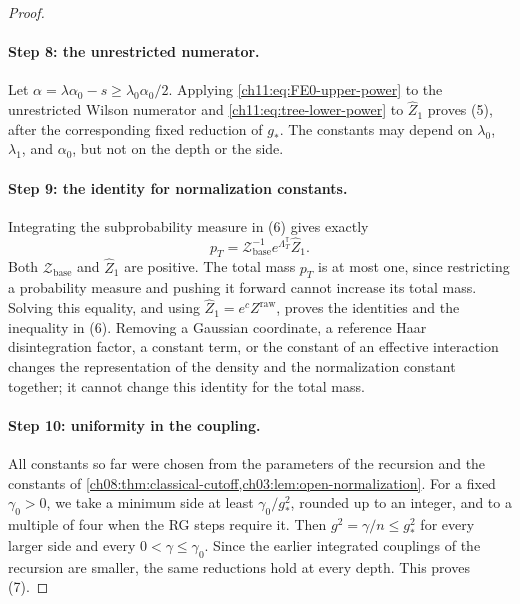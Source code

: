 \begin{proof}
\paragraph{Step 8: the unrestricted numerator.}
Let $\alpha=\lambda\alpha_0-s\ge\lambda_0\alpha_0/2$. Applying \eqref{ch11:eq:FE0-upper-power} to the unrestricted Wilson numerator and \eqref{ch11:eq:tree-lower-power} to $\widehat Z_1$ proves (5), after the corresponding fixed reduction of $g_*$. The constants may depend on $\lambda_0$, $\lambda_1$, and $\alpha_0$, but not on the depth or the side.

\paragraph{Step 9: the identity for normalization constants.}
Integrating the subprobability measure in (6) gives exactly
\[
 p_T=\mathcal Z_{\mathrm{base}}^{-1}e^{\Lambda_T^{\mathbb T}}\widehat Z_1.
\]
Both $\mathcal Z_{\mathrm{base}}$ and $\widehat Z_1$ are positive. The total mass $p_T$ is at most one, since restricting a probability measure and pushing it forward cannot increase its total mass. Solving this equality, and using $\widehat Z_1=e^cZ^{\mathrm{raw}}$, proves the identities and the inequality in (6). Removing a Gaussian coordinate, a reference Haar disintegration factor, a constant term, or the constant of an effective interaction changes the representation of the density and the normalization constant together; it cannot change this identity for the total mass.

\paragraph{Step 10: uniformity in the coupling.}
All constants so far were chosen from the parameters of the recursion and the constants of \cref{ch08:thm:classical-cutoff,ch03:lem:open-normalization}. For a fixed $\gamma_0>0$, we take a minimum side at least $\gamma_0/g_*^2$, rounded up to an integer, and to a multiple of four when the RG steps require it. Then $g^2=\gamma/n\le g_*^2$ for every larger side and every $0<\gamma\le\gamma_0$. Since the earlier integrated couplings of the recursion are smaller, the same reductions hold at every depth. This proves (7).


\end{proof}
